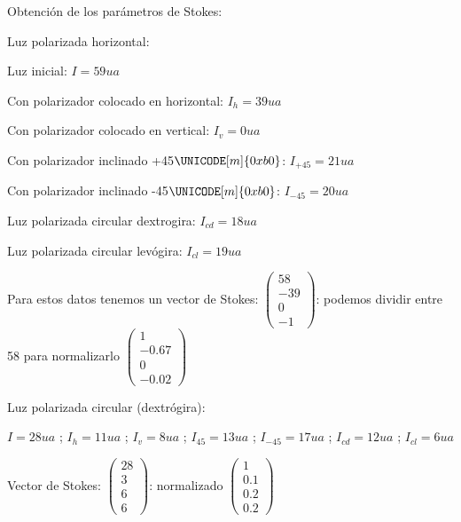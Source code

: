 \documentclass[12pt,thmsa]{article}
\begin{document}
\vspace{1pt}

Obtenci\'{o}n de los par\'{a}metros de Stokes:

\vspace{1pt}

Luz polarizada horizontal:

Luz inicial: $I=59ua$

Con polarizador colocado en horizontal: $I_{h}=39ua$

Con polarizador colocado en vertical: $I_{v}=0ua$

Con polarizador inclinado +45$\UNICODE[m]{0xb0}$: $I_{+45}=21ua$

Con polarizador inclinado -45$\UNICODE[m]{0xb0}$: $I_{-45}=20ua$

Luz polarizada circular dextrogira: $I_{cd}=18ua$

Luz polarizada circular lev\'{o}gira: $I_{cl}=19ua$

\vspace{1pt}

Para estos datos tenemos un vector de Stokes: $\left( 
\begin{array}{l}
58 \\ 
-39 \\ 
0 \\ 
-1
\end{array}
\right) $: podemos dividir entre 58 para normalizarlo $\left( 
\begin{array}{l}
1 \\ 
-0.67 \\ 
0 \\ 
-0.02
\end{array}
\right) $

Luz polarizada circular (dextr\'{o}gira):

$I=28ua$ ; $I_{h}=11ua$ ; $I_{v}=8ua$ ; $I_{45}=13ua$ ; $I_{-45}=17ua$ ; $%
I_{cd}=12ua$ ; $I_{cl}=6ua$

Vector de Stokes:  $\left( 
\begin{array}{l}
28 \\ 
3 \\ 
6 \\ 
6
\end{array}
\right) $: normalizado $\left( 
\begin{array}{l}
1 \\ 
0.1 \\ 
0.2 \\ 
0.2
\end{array}
\right) $
\end{document}
